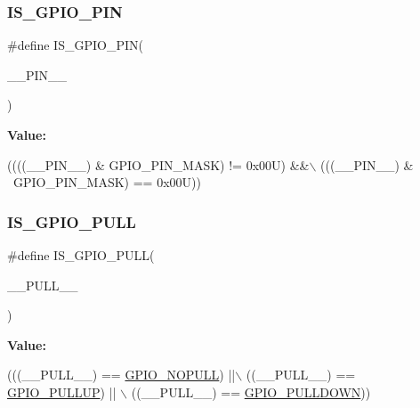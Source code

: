 \subsubsection{\texorpdfstring{I\+S\+\_\+\+G\+P\+I\+O\+\_\+\+P\+IN}{IS\_GPIO\_PIN}}
{\footnotesize\ttfamily \#define I\+S\+\_\+\+G\+P\+I\+O\+\_\+\+P\+IN(\begin{DoxyParamCaption}\item[{}]{\+\_\+\+\_\+\+P\+I\+N\+\_\+\+\_\+ }\end{DoxyParamCaption})}

{\bfseries Value\+:}
\begin{DoxyCode}
((((\_\_PIN\_\_) & GPIO\_PIN\_MASK) != 0x00U) &&\(\backslash\)
                                     (((\_\_PIN\_\_) & ~GPIO\_PIN\_MASK) == 0x00U))
\end{DoxyCode}
\mbox{\label{group___g_p_i_o___private___macros_ga6424c3fc83173de0f9f9374ed6633dc8}} 
\subsubsection{\texorpdfstring{I\+S\+\_\+\+G\+P\+I\+O\+\_\+\+P\+U\+LL}{IS\_GPIO\_PULL}}
{\footnotesize\ttfamily \#define I\+S\+\_\+\+G\+P\+I\+O\+\_\+\+P\+U\+LL(\begin{DoxyParamCaption}\item[{}]{\+\_\+\+\_\+\+P\+U\+L\+L\+\_\+\+\_\+ }\end{DoxyParamCaption})}

{\bfseries Value\+:}
\begin{DoxyCode}
(((\_\_PULL\_\_) == \hyperlink{group___g_p_i_o__pull_ga5c2862579882c1cc64e36d38fbd07a4c}{GPIO\_NOPULL})   ||\(\backslash\)
                                     ((\_\_PULL\_\_) == \hyperlink{group___g_p_i_o__pull_gae689bc8f5c42d6df7bd54a8dd372e072}{GPIO\_PULLUP})   || \(\backslash\)
                                     ((\_\_PULL\_\_) == \hyperlink{group___g_p_i_o__pull_ga75d958d0410c36da7f27d1f4f5c36c14}{GPIO\_PULLDOWN}))
\end{DoxyCode}
\mbox{\label{group___g_p_i_o___private___macros_gaa0f47c8ac2940a95613fbf60795c81c5}} 
